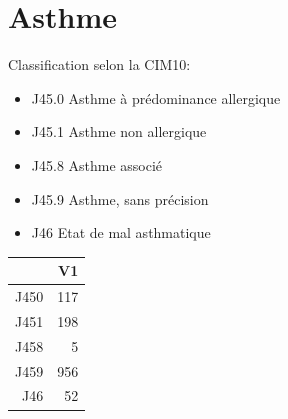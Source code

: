 \documentclass[12pt,english,french,twoside]{report}\usepackage[]{graphicx}\usepackage[]{color}
\begin{document}
\section{Asthme}

Classification selon la CIM10:
\begin{itemize}
  \item J45.0 Asthme à prédominance allergique
  \item J45.1 Asthme non allergique
  \item J45.8 Asthme associé 
  \item J45.9 Asthme, sans précision
  \item J46   Etat de mal asthmatique
\end{itemize}

\begin{table}[ht]
\centering
\begin{tabular}{rr}
  \hline
 & V1 \\ 
  \hline
J450 & 117 \\ 
  J451 & 198 \\ 
  J458 &   5 \\ 
  J459 & 956 \\ 
  J46 &  52 \\ 
   \hline
\end{tabular}
\end{table}
\end{document}
